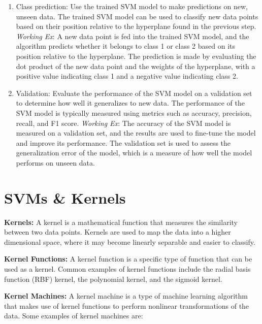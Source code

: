 \documentclass[hidelinks]{book}
\begin{document}
\begin{enumerate}
	\item Class prediction: Use the trained SVM model to make predictions on new, unseen data. The trained SVM model can be used to classify new data points based on their position relative to the hyperplane found in the previous step. \newline
	\textit{Working Ex}: A new data point is fed into the trained SVM model, and the algorithm predicts whether it belongs to class 1 or class 2 based on its position relative to the hyperplane. The prediction is made by evaluating the dot product of the new data point and the weights of the hyperplane, with a positive value indicating class 1 and a negative value indicating class 2.

	\item Validation: Evaluate the performance of the SVM model on a validation set to determine how well it generalizes to new data. The performance of the SVM model is typically measured using metrics such as accuracy, precision, recall, and F1 score. \newline
	\textit{Working Ex}: The accuracy of the SVM model is measured on a validation set, and the results are used to fine-tune the model and improve its performance. The validation set is used to assess the generalization error of the model, which is a measure of how well the model performs on unseen data.
\end{enumerate}

\section{SVMs & Kernels}
\textbf{Kernels:} A kernel is a mathematical function that measures the similarity between two data points. Kernels are used to map the data into a higher dimensional space, where it may become linearly separable and easier to classify.

\textbf{Kernel Functions:} A kernel function is a specific type of function that can be used as a kernel. Common examples of kernel functions include the radial basis function (RBF) kernel, the polynomial kernel, and the sigmoid kernel.

\textbf{Kernel Machines:} A kernel machine is a type of machine learning algorithm that makes use of kernel functions to perform nonlinear transformations of the data. Some examples of kernel machines are:
\end{document}
